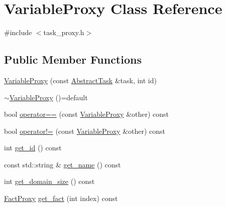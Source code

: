 \hypertarget{classVariableProxy}{\section{Variable\-Proxy Class Reference}
\label{classVariableProxy}
}


{\ttfamily \#include $<$task\-\_\-proxy.\-h$>$}

\subsection*{Public Member Functions}
\begin{DoxyCompactItemize}
\item 
\hyperlink{classVariableProxy_a74d2b3b5692fb88495b414d037d309f7}{Variable\-Proxy} (const \hyperlink{classAbstractTask}{Abstract\-Task} \&task, int id)
\item 
\hyperlink{classVariableProxy_a056a4abacfcb9130ddb2e717cad3ded7}{$\sim$\-Variable\-Proxy} ()=default
\item 
bool \hyperlink{classVariableProxy_ab43d7dccf5697c0243cdbaab4c0bed6a}{operator==} (const \hyperlink{classVariableProxy}{Variable\-Proxy} \&other) const 
\item 
bool \hyperlink{classVariableProxy_aac362d8c92edde04c18fe4e886d8102b}{operator!=} (const \hyperlink{classVariableProxy}{Variable\-Proxy} \&other) const 
\item 
int \hyperlink{classVariableProxy_ac3b398d41af8e1e188c2a743bbe802a6}{get\-\_\-id} () const 
\item 
const std\-::string \& \hyperlink{classVariableProxy_a42d595614ede5a618b2bee7b97a7b03a}{get\-\_\-name} () const 
\item 
int \hyperlink{classVariableProxy_a603b9c3d1c7a59a12641b530305d44c2}{get\-\_\-domain\-\_\-size} () const 
\item 
\hyperlink{classFactProxy}{Fact\-Proxy} \hyperlink{classVariableProxy_ae37248cfd9655937cf1032f146f1304f}{get\-\_\-fact} (int index) const 
\end{DoxyCompactItemize}


